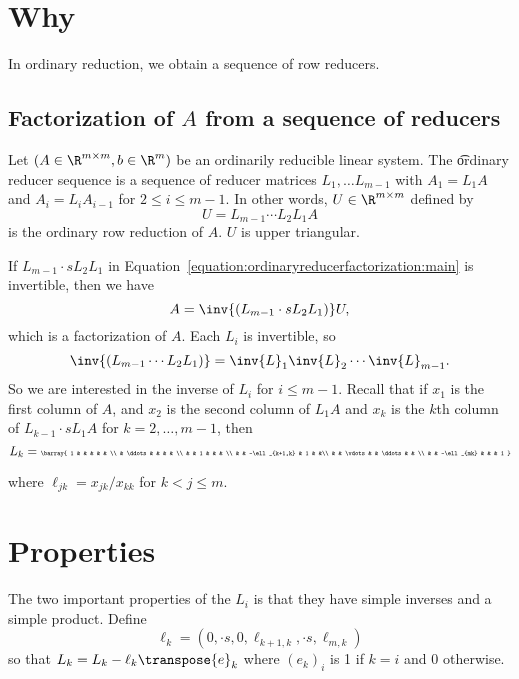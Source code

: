 

\section*{Why}

In ordinary reduction, we obtain a sequence of row reducers.

\subsection*{Factorization of $A$ from a sequence of reducers}

Let $(A \in \R ^{m \times m}, b \in \R ^{m})$ be an ordinarily reducible linear system.
The \t{ordinary reducer sequence} is a sequence of reducer matrices $L_{1}, \dots  L_{m-1}$ with $A_1 = L_1A$ and $A_i = L_iA_{i-1}$ for $2 \leq i \leq m-1$.
In other words, $U \in \R ^{m \times m}$ defined by
\begin{equation}
    \label{equation:ordinaryreducerfactorization:main}U = L_{m-1} \cdots L_2 L_1 A\end{equation}
is the ordinary row reduction of $A$.
$U$ is upper triangular.

If $L_{m-1}\cdot s L_2 L_1$ in Equation~\eqref{equation:ordinaryreducerfactorization:main} is invertible, then we have
\[
A = \inv{(L_{m-1}\cdot s L_2 L_1)}U,
\]
which is a factorization of $A$.
Each $L_i$ is invertible, so
\[
\inv{(L_{m-1} \cdots L_2 L_1)} = \inv{L}_1\inv{L}_2\cdots\inv{L}_{m-1}.
\]
So we are interested in the inverse of $L_i$ for $i \leq m-1$.
Recall that if $x_1$ is the first column of $A$, and $x_2$ is the second column of $L_1A$ and $x_k$ is the $k$th column of $L_{k-1}\cdot s L_{1}A$ for $k = 2, \dots , m-1$, then
\[
{\tiny
L_k = \barray{
1 & & & & & \\
& \ddots & & & & \\
& & 1 & & & \\
& & -\ell _{k+1,k} & 1 & &\\
& & \vdots & & \ddots & & \\
& & -\ell _{mk} & & & 1
}
}
\]

where $\ell _{jk} = x_{jk}/x_{kk}$ for $k < j \leq m$.
\section*{Properties}

The two important properties of the $L_i$ is that they have simple inverses and a simple product.
Define
\[
\ell _k = (0,\cdot s, 0,\ell _{k+1,k}, \cdot s, \ell _{m,k})
\]
so that $L_k = L_k - \ell _k\transpose{e}_k$ where $(e_k)_i$ is 1 if $k = i$ and 0 otherwise.

